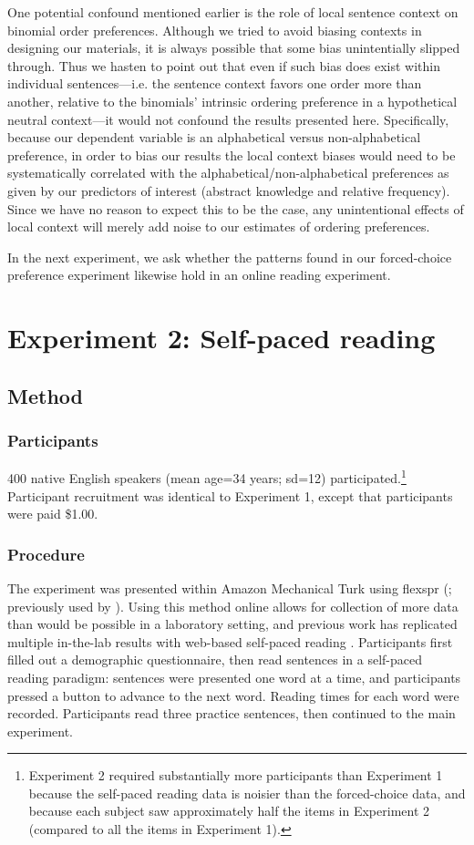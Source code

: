 \documentclass[authoryear]{elsarticle}
\begin{document}
One potential confound mentioned earlier is the role of local sentence context on binomial order preferences. Although we tried to avoid biasing contexts in designing our materials, it is always possible that some bias unintentially slipped through. Thus we hasten to point out that even if such bias does exist within individual sentences---i.e. the sentence context favors one order more than another, relative to the binomials' intrinsic ordering preference in a hypothetical neutral context---it would not confound the results presented here. Specifically, because our dependent variable is an alphabetical versus non-alphabetical preference, in order to bias our results the local context biases would need to be systematically correlated with the alphabetical/non-alphabetical preferences as given by our predictors of interest (abstract knowledge and relative frequency). Since we have no reason to expect this to be the case, any unintentional effects of local context will merely add noise to our estimates of ordering preferences.

In the next experiment, we ask whether the patterns found in our forced-choice preference experiment likewise hold in an online reading experiment.


\section{Experiment 2: Self-paced reading}\label{expt2}
\subsection{Method}
\subsubsection{Participants}
400 native English speakers (mean age=34 years; sd=12) participated.\footnote{Experiment 2 required substantially more participants than Experiment 1 because the self-paced reading data is noisier than the forced-choice data, and because each subject saw approximately half the items in Experiment 2 (compared to all the items in Experiment 1).} Participant recruitment was identical to Experiment 1, except that participants were paid \$1.00.

\subsubsection{Procedure}
The experiment was presented within Amazon Mechanical Turk using flexspr (\citealp{flexspr:cFpvxjkw}; previously used by \citealp{Bergen:2012ur,Singh:2015uf}). Using this method online allows for collection of more data than would be possible in a laboratory setting, and previous work has replicated multiple in-the-lab results with web-based self-paced reading \citep{Enochson:2015dy}. Participants first filled out a demographic questionnaire, then read sentences in a self-paced reading paradigm: sentences were presented one word at a time, and participants pressed a button to advance to the next word. Reading times for each word were recorded. Participants read three practice sentences, then continued to the main experiment.
\end{document}

